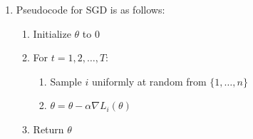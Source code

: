 \documentclass[12pt]{article}
\theoremstyle{definitionstyle}
\begin{document}
\begin{enumerate}[leftmargin=\labelsep]
\begin{enumerate}[label=(\alph*)]
            \item
            Pseudocode for SGD is as follows:
            \begin{enumerate}
                \item Initialize $\theta$ to 0
                \item For $t = 1, 2, \ldots, T$:
                \begin{enumerate}
                    \item Sample $i$ uniformly at random from $\{1, \ldots, n\}$
                    \item $\theta = \theta - \alpha \nabla L_i(\theta)$
                \end{enumerate}
                \item Return $\theta$
            \end{enumerate}


\end{enumerate}
\end{enumerate}
\end{document}
